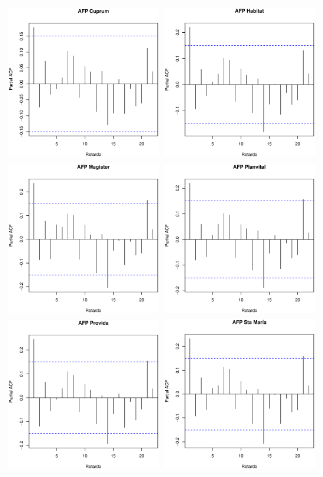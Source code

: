 \begin{figure}[!ht]
\begin{center}
\centering
  \includegraphics[height=4cm, width=4cm]{pacf1.eps}
  \includegraphics[height=4cm, width=4cm]{pacf2.eps}
  \includegraphics[height=4cm, width=4cm]{pacf3.eps}
  \includegraphics[height=4cm, width=4cm]{pacf4.eps}\\
  \includegraphics[height=4cm, width=4cm]{pacf5.eps}
  \includegraphics[height=4cm, width=4cm]{pacf6.eps}

\end{center}
\end{figure}
